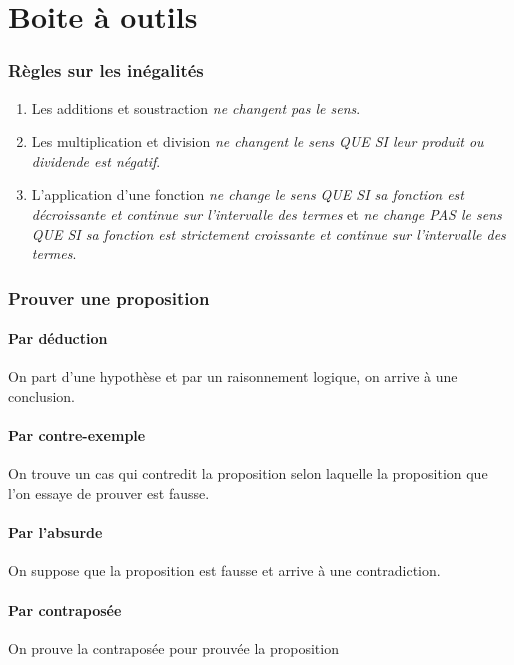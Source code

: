 \documentclass{article}
\begin{document}
\pagebreak\part{Boite à outils}
\setcounter{section}{0}
\renewcommand*{\theHsection}{chX.\the\value{section}}



\section{Règles sur les inégalités}
\begin{enumerate}
	\item Les additions et soustraction \emph{ne changent pas le sens}.
	\item Les multiplication et division \emph{ne changent le sens QUE SI leur produit ou dividende est négatif}.
	\item L'application d'une fonction \emph{ne change le sens QUE SI sa fonction est décroissante et continue sur l'intervalle des termes} et \emph{ne change PAS le sens QUE SI sa fonction est strictement croissante et continue sur l'intervalle des termes}.
\end{enumerate}


\section{Prouver une proposition}

\subsection{Par déduction}
On part d'une hypothèse et par un raisonnement logique, on arrive à une conclusion.

\subsection{Par contre-exemple}
On trouve un cas qui contredit la proposition selon laquelle la proposition que l'on essaye de prouver est fausse.

\subsection{Par l'absurde}
On suppose que la proposition est fausse et arrive à une contradiction.

\subsection{Par contraposée}
On prouve la contraposée pour prouvée la proposition
\end{document}
